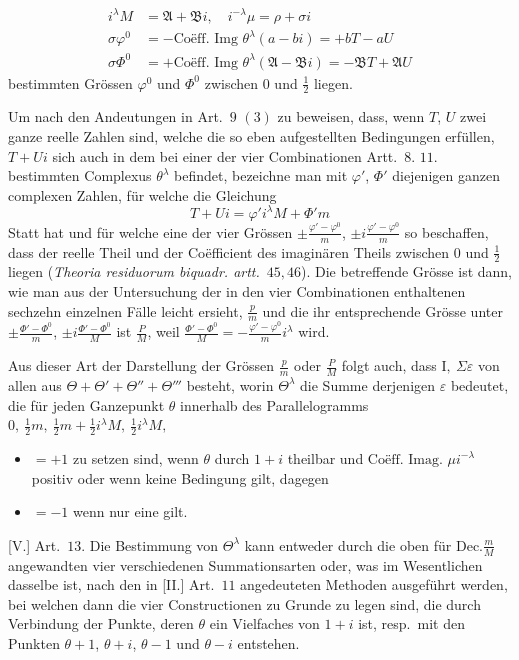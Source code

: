 %
\[
\begin{aligned}
i^\lambda M&=\mathfrak A+\mathfrak B i,\quad i^{-\lambda}\mu=\rho+\sigma i\\
\sigma\varphi^0&=-\text{Coëff. Img }\theta^\lambda(a-bi)=+bT-aU\\
\sigma\Phi^0&=+\text{Coëff. Img }\theta^\lambda(\mathfrak A-\mathfrak B i)=-\mathfrak B T+\mathfrak A U
\end{aligned}
\]
bestimmten Grössen $\varphi^0$ und $\Phi^0$ zwischen $0$ und $\tfrac12$ liegen.

Um nach den Andeutungen in Art.\ $9$ $(3)$ zu beweisen, dass, wenn $T$, $U$ zwei ganze reelle Zahlen sind, welche die so eben aufgestellten Bedingungen erfüllen, $T+Ui$ sich auch in dem bei einer der vier Combinationen Artt.\ $8$. $11$. bestimmten Complexus $\theta^\lambda$ befindet, bezeichne man mit $\varphi'$, $\Phi'$ diejenigen ganzen complexen Zahlen, für welche die Gleichung
\[
T+Ui=\varphi'i^\lambda M+\Phi'm
\]
Statt hat und für welche eine der vier Grössen $\pm\frac{\varphi'-\varphi^0}{m}$, $\pm i\frac{\varphi'-\varphi^0}{m}$ so beschaffen, dass der reelle Theil und der Coëfficient des imaginären Theils zwischen $0$ und $\tfrac12$ liegen (\textit{Theoria residuorum biquadr. artt.}\ $45,46$). Die betreffende Grösse ist dann, wie man aus der Untersuchung der in den vier Combinationen enthaltenen sechzehn einzelnen Fälle leicht ersieht, $\frac pm$ und die ihr entsprechende Grösse unter $\pm\frac{\Phi'-\Phi^0}{m}$, $\pm i\frac{\Phi'-\Phi^0}{M}$ ist $\frac PM$, weil $\frac{\Phi'-\Phi^0}{M}=-\frac{\varphi'-\varphi^0}{m}i^\lambda$ wird.

Aus dieser Art der Darstellung der Grössen $\frac pm$ oder $\frac PM$ folgt auch, dass $\mathrm I,\ \Sigma\varepsilon$ von allen aus $\Theta+\Theta'+\Theta''+\Theta'''$ besteht, worin $\Theta^\lambda$ die Summe derjenigen $\varepsilon$ bedeutet, die für jeden Ganzepunkt $\theta$ innerhalb des Parallelogramms $0,\ \tfrac12m,\ \tfrac12m+\tfrac12i^\lambda M,\ \tfrac12i^\lambda M,$
\begin{itemize}
\item[] $=+1$ zu setzen sind, wenn $\theta$ durch $1+i$ theilbar und $\text{Coëff. Imag. }\mu i^{-\lambda}$ positiv oder wenn keine Bedingung gilt, dagegen
\item[] $=-1$ wenn nur eine gilt.
\end{itemize}

[V.] Art.\ $13$. Die Bestimmung von $\Theta^\lambda$ kann entweder durch die oben für $\mathrm{Dec.}\frac mM$ angewandten vier verschiedenen Summationsarten oder, was im Wesentlichen dasselbe ist, nach den in [II.] Art.\ $11$ angedeuteten Methoden ausgeführt werden, bei welchen dann die vier Constructionen zu Grunde zu legen sind, die durch Verbindung der Punkte, deren $\theta$ ein Vielfaches von $1+i$ ist, resp.\ mit den Punkten $\theta+1$, $\theta+i$, $\theta-1$ und $\theta-i$ entstehen.

